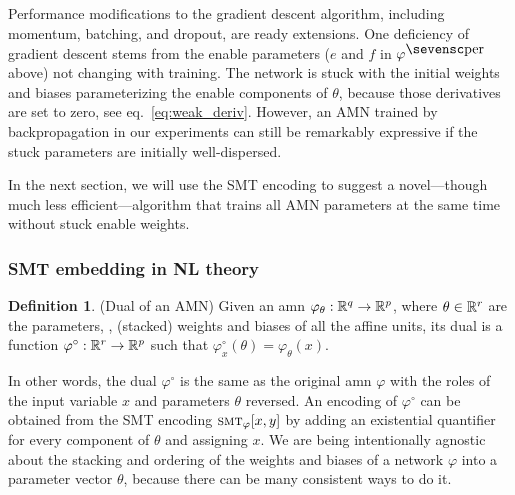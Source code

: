 \documentclass[10pt]{article}
\newcommand{\amn}{\varphi}
\newcommand{\smt}{\mbox{\sc smt}}
\theoremstyle{remark}
\newtheorem{example}{Example}
\theoremstyle{definition}
\newtheorem{definition}{Definition}
\theoremstyle{plain}
\begin{document}
Performance modifications to the gradient descent algorithm, including
momentum, batching, and dropout, are ready extensions.
One deficiency of gradient descent stems from the enable parameters ($e$ and
$f$ in $\amn^\mathsc{per}$ above) not changing with training. The network is
stuck with the initial weights and biases parameterizing the enable components
of $\theta$, because those derivatives are set to zero,
see eq.~\eqref{eq:weak_deriv}.  However,
an AMN trained by backpropagation in our experiments can still be remarkably
expressive if the stuck parameters are initially well-dispersed. 

In the next section, we will use the SMT encoding to suggest a novel---though
much less efficient---algorithm that trains all AMN parameters at the same time
without stuck enable weights.


\subsubsection{SMT embedding in NL theory}
\begin{definition}(Dual of an AMN)
Given an \acs{amn} $\amn_\theta : \reals^q \to \reals^p$, where
$\theta\in\mathbb{R}^r$ are the parameters, \ie, (stacked) weights and biases of
all the affine units, its dual is a function $\amn^\circ : \reals^r
\to\reals^p$ such that $\amn_x^\circ(\theta) = \amn_\theta(x)$.
\end{definition}

In other words, the dual $\amn^\circ$ is the same as the original
\acs{amn} $\amn$ with the roles of the input variable $x$ and parameters
$\theta$ reversed. An encoding of $\amn^\circ$ can be obtained from the SMT
encoding $\smt_\amn[x,y]$ by adding an existential quantifier for every
component of $\theta$ and assigning $x$.
We are being intentionally agnostic about the stacking and ordering of the
weights and biases of a network $\amn$ into a parameter vector $\theta$,
because there can be many consistent ways to do it. 
\end{document}
